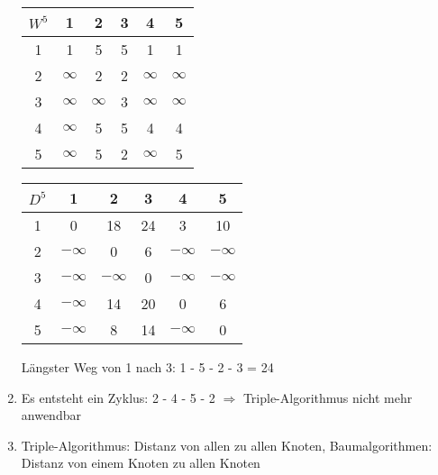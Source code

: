 \documentclass{article}
\begin{document}
\begin{enumerate}[label=(\alph*)]
\begin{center}
		\end{center}
		\begin{center}
			\begin{tabular}{c|ccccc}
				$W^5$ & 1 & 2 & 3 & 4 & 5 \\
				\hline
				1 & 1 & 5 & 5 & 1 & \cellcolor{blue!20}1 \\
				2 & $\infty$ & 2 & 2 & $\infty$ & \cellcolor{blue!20}$\infty$ \\
				3 & $\infty$ & $\infty$ & 3 & $\infty$ & \cellcolor{blue!20}$\infty$ \\
				4 & $\infty$ & 5 & 5 & 4 & \cellcolor{blue!20}4 \\
				5 & \cellcolor{blue!20}$\infty$ & \cellcolor{blue!20}5 & \cellcolor{blue!20}2 & \cellcolor{blue!20}$\infty$ & \cellcolor{blue!20}5
			\end{tabular}
			\begin{tabular}{c|ccccc}
				$D^5$ & 1 & 2 & 3 & 4 & 5 \\
				\hline
				1 & 0 & 18 & 24 & 3 & \cellcolor{blue!20}10 \\
				2 & $-\infty$ & 0 & 6 & $-\infty$ & \cellcolor{blue!20}$-\infty$ \\
				3 & $-\infty$ & $-\infty$ & 0 & $-\infty$ & \cellcolor{blue!20}$-\infty$ \\
				4 & $-\infty$ & 14 & 20 & 0 & \cellcolor{blue!20}6 \\
				5 & \cellcolor{blue!20}$-\infty$ & \cellcolor{blue!20}8 & \cellcolor{blue!20}14 & \cellcolor{blue!20}$-\infty$ & \cellcolor{blue!20}0
			\end{tabular}
		\end{center}
		Längster Weg von 1 nach 3: 1 - 5 - 2 - 3 = 24
		\item Es entsteht ein Zyklus: 2 - 4 - 5 - 2 $\Rightarrow$ Triple-Algorithmus nicht mehr anwendbar
		\item Triple-Algorithmus: Distanz von allen zu allen Knoten, Baumalgorithmen: Distanz von einem Knoten zu allen Knoten
	\end{enumerate}
\end{document}
